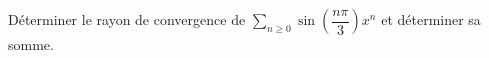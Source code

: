 \documentclass[a4paper,twoside,french,11pt]{VcCours}
\newcommand{\Sum}[2]{\sum_{#1}^{#2}}
\begin{document}

\begin{Exercice}{}
Déterminer le rayon de convergence de $\Sum{n\geq 0}{} \sin \left( \dfrac{n \pi}{3} \right) x^n$ et déterminer sa somme.
\end{Exercice}

%
\end{document}
